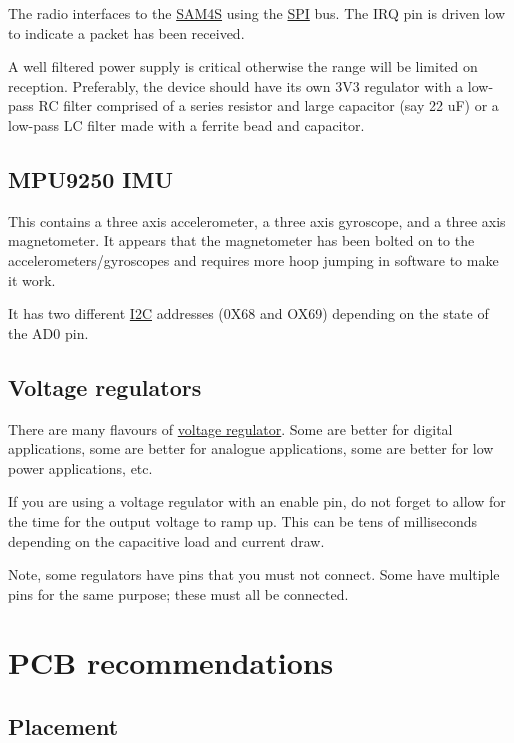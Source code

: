 The radio interfaces to the \url{SAM4S} using the \url{SPI} bus. The IRQ
pin is driven low to indicate a packet has been received.

A well filtered power supply is critical otherwise the range will be
limited on reception. Preferably, the device should have its own 3V3
regulator with a low-pass RC filter comprised of a series resistor and
large capacitor (say 22 uF) or a low-pass LC filter made with a ferrite
bead and capacitor.

\subsection{MPU9250 IMU}\label{mpu9250-imu}

This contains a three axis accelerometer, a three axis gyroscope, and a
three axis magnetometer. It appears that the magnetometer has been
bolted on to the accelerometers/gyroscopes and requires more hoop
jumping in software to make it work.

It has two different \url{I2C} addresses (0X68 and OX69) depending on
the state of the AD0 pin.


\subsection{Voltage regulators}\label{voltage-regulators}

There are many flavours of \href{voltage_regulators}{voltage regulator}.
Some are better for digital applications, some are better for analogue
applications, some are better for low power applications, etc.

If you are using a voltage regulator with an enable pin, do not forget
to allow for the time for the output voltage to ramp up. This can be
tens of milliseconds depending on the capacitive load and current draw.

Note, some regulators have pins that you must not connect. Some have
multiple pins for the same purpose; these must all be connected.

\section{PCB recommendations}\label{pcb-recommendations}

\subsection{Placement}\label{placement}


